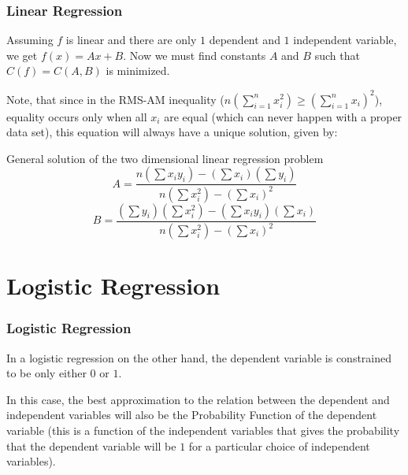 \documentclass{beamer}
\begin{document}
    \begin{frame}
        \frametitle{Linear Regression}
        Assuming $f$ is linear and there are only $1$ dependent and $1$ independent variable, we get $f(x) = Ax + B$. 
        Now we must find constants $A$ and $B$ such that $C(f) = C(A, B)$ is minimized.

        
        Note, that since in the RMS-AM inequality ($n(\sum_{i = 1}^{n} x_{i}^{2}) \geq (\sum_{i = 1}^{n} x_{i})^{2}$), equality occurs only when all 
        $x_{i}$ are equal (which can never happen with a proper data set), this equation will always have a unique solution, given by:
        \begin{block}{General solution of the two dimensional linear regression problem}
            \begin{equation}
                A = \frac{n(\sum x_{i}y_{i}) - (\sum x_{i})(\sum y_{i})}{n(\sum x_{i}^{2}) - (\sum x_{i})^{2}}
            \end{equation}
            \begin{equation}
                B = \frac{(\sum y_{i})(\sum x_{i}^{2}) - (\sum x_{i}y_{i})(\sum x_{i})}{n(\sum x_{i}^{2}) - (\sum x_{i})^{2}}
            \end{equation}    
        \end{block}
    \end{frame}

    \section{Logistic Regression}
    
    \begin{frame}
        \frametitle{Logistic Regression}
        In a logistic regression on the other hand, the dependent variable is constrained to be only either $0$ or $1$.


        In this case, the best approximation to the relation between the dependent and independent variables will also be the
        Probability Function of the dependent variable (this is a function of the independent variables that gives the probability 
        that the dependent variable will be $1$ for a particular choice of independent variables).
    \end{frame}
\end{document}
